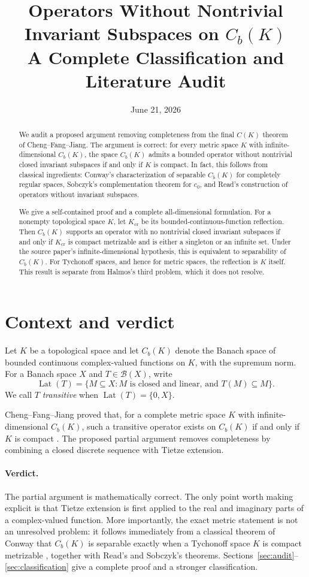 \documentclass[11pt]{article}
\title{Operators Without Nontrivial Invariant Subspaces on $C_b(K)$\\
A Complete Classification and Literature Audit}
\author{}
\date{June 21, 2026}
\theoremstyle{remark}
\newcommand{\Cb}{C_b}
\newcommand{\B}{\mathcal B}
\newcommand{\Lat}{\operatorname{Lat}}
\begin{document}
\maketitle

\begin{abstract}
We audit a proposed argument removing completeness from the final
$C(K)$ theorem of Cheng--Fang--Jiang.  The argument is correct: for every
metric space $K$ with infinite-dimensional $C_b(K)$, the space $C_b(K)$
admits a bounded operator without nontrivial closed invariant subspaces if
and only if $K$ is compact.  In fact, this follows from classical ingredients:
Conway's characterization of separable $C_b(K)$ for completely regular
spaces, Sobczyk's complementation theorem for $c_0$, and Read's construction
of operators without invariant subspaces.

We give a self-contained proof and a complete all-dimensional formulation.
For a nonempty topological space $K$, let $K_{\mathrm{cr}}$ be its
bounded-continuous-function reflection.  Then $C_b(K)$ supports an operator
with no nontrivial closed invariant subspaces if and only if
$K_{\mathrm{cr}}$ is compact metrizable and is either a singleton or an
infinite set.  Under the source paper's infinite-dimensional hypothesis, this
is equivalent to separability of $C_b(K)$.  For Tychonoff spaces, and hence
for metric spaces, the reflection is $K$ itself.  This result is separate from
Halmos's third problem, which it does not resolve.
\end{abstract}

\section{Context and verdict}

Let $K$ be a topological space and let $\Cb(K)$ denote the Banach space of
bounded continuous complex-valued functions on $K$, with the supremum norm.
For a Banach space $X$ and $T\in\B(X)$, write
\[
  \Lat(T)=\{M\subseteq X: M\text{ is closed and linear, and }T(M)\subseteq M\}.
\]
We call $T$ \emph{transitive} when $\Lat(T)=\{0,X\}$.

Cheng--Fang--Jiang proved that, for a complete metric space $K$ with
infinite-dimensional $\Cb(K)$, such a transitive operator exists on $\Cb(K)$
if and only if $K$ is compact \cite[Theorem 16.1]{CFJ}.  The proposed partial
argument removes completeness by combining a closed discrete sequence with
Tietze extension.

\paragraph{Verdict.}
The partial argument is mathematically correct.  The only point worth making
explicit is that Tietze extension is first applied to the real and imaginary
parts of a complex-valued function.  More importantly, the exact metric
statement is not an unresolved problem: it follows immediately from a
classical theorem of Conway that $\Cb(K)$ is separable exactly when a
Tychonoff space $K$ is compact metrizable \cite[Theorem V.6.6, p.~140]{Conway},
together with Read's and Sobczyk's theorems.  Sections~\ref{sec:audit}--
\ref{sec:classification} give a complete proof and a stronger classification.
\end{document}
